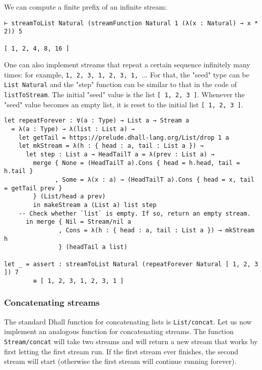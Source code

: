 We can compute a finite prefix of an infinite stream:


\begin{lstlisting}[language=Dhall]
⊢ streamToList Natural (streamFunction Natural 1 (λ(x : Natural) → x * 2)) 5

[ 1, 2, 4, 8, 16 ]
\end{lstlisting}


One can also implement streams that repeat a certain sequence infinitely many times: for example, \lstinline!1, 2, 3, 1, 2, 3, 1, !...
For that, the "seed" type can be \lstinline!List Natural! and the "step" function can be similar to that in the code of \lstinline!listToStream!.
The initial "seed" value is the list \lstinline![ 1, 2, 3 ]!.
Whenever the "seed" value becomes an empty list, it is reset to the initial list \lstinline![ 1, 2, 3 ]!.


\begin{lstlisting}[language=Dhall]
let repeatForever : ∀(a : Type) → List a → Stream a
  = λ(a : Type) → λ(list : List a) →
    let getTail = https://prelude.dhall-lang.org/List/drop 1 a
    let mkStream = λ(h : { head : a, tail : List a }) → 
      let step : List a → HeadTailT a = λ(prev : List a) →
        merge { None = (HeadTailT a).Cons { head = h.head, tail = h.tail }
              , Some = λ(x : a) → (HeadTailT a).Cons { head = x, tail = getTail prev }
        } (List/head a prev)
        in makeStream a (List a) list step
    -- Check whether `list` is empty. If so, return an empty stream.
      in merge { Nil = Stream/nil a
               , Cons = λ(h : { head : a, tail : List a }) → mkStream h
               } (headTail a list)

let _ = assert : streamToList Natural (repeatForever Natural [ 1, 2, 3 ]) 7
        ≡ [ 1, 2, 3, 1, 2, 3, 1 ]
\end{lstlisting}


\subsubsection{Concatenating streams}


The standard Dhall function for concatenating lists is \lstinline!List/concat!.
Let us now implement an analogous function for concatenating streams.
The function \lstinline!Stream/concat! will take two streams and will return a new stream that works by first letting the first stream run.
If the first stream ever finishes, the second stream will start (otherwise the first stream will continue running forever).


